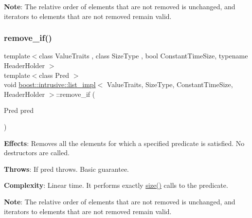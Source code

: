 {\bfseries Note}\+: The relative order of elements that are not removed is unchanged, and iterators to elements that are not removed remain valid. \mbox{\label{classboost_1_1intrusive_1_1list__impl_ab74f15b0c56ff811322551eb7090be2d}} 
\subsubsection{\texorpdfstring{remove\+\_\+if()}{remove\_if()}}
{\footnotesize\ttfamily template$<$class Value\+Traits , class Size\+Type , bool Constant\+Time\+Size, typename Header\+Holder $>$ \\
template$<$class Pred $>$ \\
void \hyperlink{classboost_1_1intrusive_1_1list__impl}{boost\+::intrusive\+::list\+\_\+impl}$<$ Value\+Traits, Size\+Type, Constant\+Time\+Size, Header\+Holder $>$\+::remove\+\_\+if (\begin{DoxyParamCaption}\item[{Pred}]{pred }\end{DoxyParamCaption})\hspace{0.3cm}{\ttfamily [inline]}}

{\bfseries Effects}\+: Removes all the elements for which a specified predicate is satisfied. No destructors are called.

{\bfseries Throws}\+: If pred throws. Basic guarantee.

{\bfseries Complexity}\+: Linear time. It performs exactly \hyperlink{classboost_1_1intrusive_1_1list__impl_a9da0074a31566f3a7dbc3cd1a2d752c1}{size()} calls to the predicate.

{\bfseries Note}\+: The relative order of elements that are not removed is unchanged, and iterators to elements that are not removed remain valid. \mbox{\label{classboost_1_1intrusive_1_1list__impl_a4e8cb800394865d8a46cf83510b2dfbd}} 
